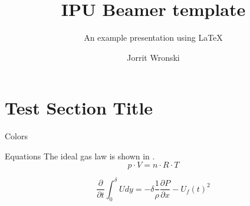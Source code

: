 \documentclass[aspectratio=169,hyperref={pdfpagelabels=false}]{beamer}
\subtitle{An example presentation using \LaTeX}
\title{IPU Beamer template}
\author{Jorrit Wronski}
\begin{document}
\inserttitlepage

\section{Test Section Title}

\begin{frame}{Colors}
\begin{testcolors}[rgb]


\end{testcolors}
\end{frame}

%

\begin{frame}{Equations}
The ideal gas law is shown in .
\begin{equation}
    p \cdot V = n \cdot R \cdot T
\end{equation}

\begin{equation} \label{eq:IME}
    \frac{\partial}{\partial t} \int_{0}^{\delta} U dy = - \delta \frac{1}{\rho}\frac{\partial P}{\partial x}-U_f(t)^2
\end{equation}

\vspace{\fill}

\end{frame}
\end{document}
